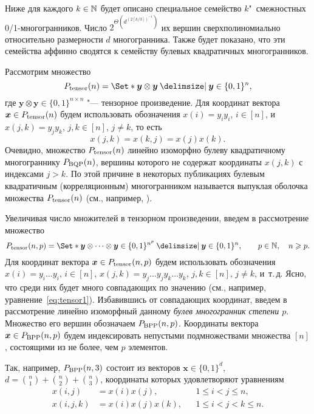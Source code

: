 Ниже для каждого $k\in\mathbb{N}$ будет описано специальное семейство $k$"~смежностных 0/1-многогранников.
Число $2^{\Theta\left(d^{(2\left\lceil k/3\right\rceil)^{-1}}\right)}$ их вершин сверхполиномиально относительно размерности $d$ многогранника. 
Также будет показано, что эти семейства аффинно сводятся к семейству булевых квадратичных многогранников.


Рассмотрим множество 
\[
\Tensor(n) = \Set*{\bm{y}\otimes \bm{y} \given \bm{y} \in \{0,1\}^n},
\]
где $\bm{y}\otimes \bm{y} \in \{0,1\}^{n\times n}$ "--- тензорное произведение.
Для координат вектора $\bm{x} \in P_{\textup{tensor}}(n)$ будем использовать обозначения $x(i) = y_i y_i$, $i \in [n]$, и $x(j,k) = y_j y_k$, $j,k\in [n]$, $j \neq k$, то есть
\begin{equation}
\label{eq:tensor1}
x(j,k) = x(k,j) = x(j) x(k).
\end{equation}
Очевидно, множество $P_{\textup{tensor}}(n)$ линейно изоморфно булеву квадратичному многограннику $P_{\textup{BQP}}(n)$, вершины которого не содержат координаты $x(j,k)$ с индексами $j > k$.
По этой причине в некоторых публикациях булевым квадратичным (корреляционным) многогранником называется выпуклая оболочка множества $P_{\textup{tensor}}(n)$ (см., например, \cite{FioriniPokutta:2015}).

Увеличивая число множителей в тензорном произведении, введем в рассмотрение множество
\[
\Tensor(n,p) = \Set*{\bm{y}\otimes \dots \otimes\bm{y} \in \{0,1\}^{n^p} \given \bm{y} \in \{0,1\}^n},
\qquad p \in \N, \quad n \ge p.
\]
Для координат вектора $\bm{x} \in P_{\textup{tensor}}(n,p)$ будем использовать обозначения $x(i) = y_i \dots y_i$, $i \in [n]$, $x(j,k) = y_j \dots y_j y_k \dots y_k$, $j,k\in [n]$, $j \neq k$, и~т.\,д.
Ясно, что среди них будет много совпадающих по значению (см., например, уравнение~\eqref{eq:tensor1}).
Избавившись от совпадающих координат, введем в рассмотрение линейно изоморфный данному \emph{булев многогранник степени $p$}. Множество его вершин обозначаем $P_{\textup{BPP}}(n,p)$.
Координаты вектора $\bm{x} \in P_{\textup{BPP}}(n,p)$ будем индексировать непустыми подмножествами множества $[n]$, состоящими из не более, чем $p$ элементов.

Так, например, $P_{\textup{BPP}}(n,3)$ состоит из векторов $\bm{x} \in \{0,1\}^{d}$, $d = \binom{n}{1} + \binom{n}{2} + \binom{n}{3}$, координаты которых удовлетворяют уравнениям
\begin{align*}
x(i,j) &= x(i) x(j), && 1\le i < j \le n,\\
x(i,j,k) &= x(i) x(j) x(k), && 1\le i < j < k \le n.
\end{align*}

